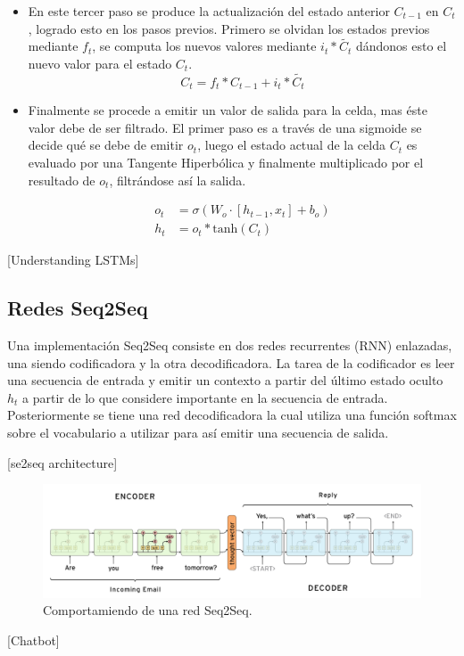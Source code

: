 \documentclass[12pt, letterpaper]{article}
\begin{document}
\begin{itemize}
            \item En este tercer paso se produce la actualización del estado anterior $C_{t-1}$ en $C_t$, logrado esto en los pasos previos. Primero se olvidan los estados previos mediante $f_t$, se computa los nuevos valores mediante $i_t*\tilde{C_t}$ dándonos esto el nuevo valor para el estado $C_t$. 
            \begin{equation}
                    C_t = f_t* C_{t-1} + i_t*\tilde{C_t}
            \end{equation}

            \item Finalmente se procede a emitir un valor de salida para la celda, mas éste valor debe de ser filtrado. El primer paso es a través de una sigmoide se decide qué se debe de emitir $o_t$, luego el estado actual de la celda $C_t$ es evaluado por una Tangente Hiperbólica y finalmente multiplicado por el resultado de $o_t$, filtrándose así la salida.

            \begin{equation}
                \begin{aligned}
                    o_t &= \sigma(W_o\cdot{[h_{t-1}, x_t]} + b_o) \\
                    h_t &=  o_t*\text{tanh}(C_t)
                \end{aligned}
            \end{equation}
        \end{itemize}
    [Understanding LSTMs]
    \subsection{Redes Seq2Seq}
    Una implementación Seq2Seq consiste en dos redes recurrentes (RNN) enlazadas, una siendo codificadora y la otra decodificadora. La tarea de la codificador es leer una secuencia de entrada y emitir un contexto a partir del último estado oculto $h_t$ a partir de lo que considere importante en la secuencia de entrada. Posteriormente se tiene una red decodificadora la cual utiliza una función softmax sobre el vocabulario a utilizar para así emitir una secuencia de salida.

    [se2seq architecture]

    \begin{figure}[H]
        \centering
        \includegraphics[width=\linewidth]{img/Seq2Seq.png}
        \caption{Comportamiendo de una red Seq2Seq.}
    \end{figure}
    [Chatbot]
\end{document}
